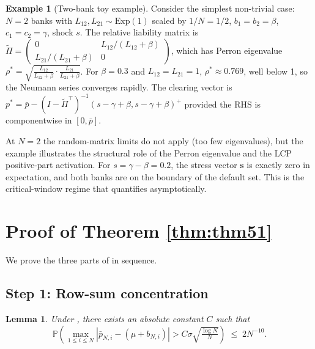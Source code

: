 \documentclass[11pt,a4paper]{article}
\newtheorem{lemma}[theorem]{Lemma}
\theoremstyle{definition}
\newtheorem{example}[theorem]{Example}
\newcommand{\rhoStar}{\rho^\ast}
\begin{document}
\begin{example}[Two-bank toy example]
Consider the simplest non-trivial case: $N = 2$ banks with
$L_{12},L_{21}\sim\mathrm{Exp}(1)$ scaled by $1/N = 1/2$,
$b_1 = b_2 = \beta$, $c_1 = c_2 = \gamma$, shock $s$. The relative liability
matrix is
$\widetilde\Pi = \begin{pmatrix}0 & L_{12}/(L_{12}+\beta)\\ L_{21}/(L_{21}+\beta) & 0\end{pmatrix}$,
which has Perron eigenvalue
$\rhoStar = \sqrt{\frac{L_{12}}{L_{12}+\beta}\cdot\frac{L_{21}}{L_{21}+\beta}}$.
For $\beta = 0.3$ and $L_{12} = L_{21} = 1$, $\rhoStar\approx 0.769$, well
below 1, so the Neumann series converges rapidly. The clearing vector is
$p^\ast = \bar p - (I - \widetilde\Pi^\top)^{-1}(s - \gamma + \beta,s - \gamma+\beta)^+$
provided the RHS is componentwise in $[0,\bar p]$.

At $N = 2$ the random-matrix limits do not apply (too few eigenvalues), but
the example illustrates the structural role of the Perron eigenvalue and the
LCP positive-part activation. For $s = \gamma - \beta = 0.2$, the stress
vector $\mathbf s$ is exactly zero in expectation, and both banks are on
the boundary of the default set. This is the critical-window regime that
 quantifies asymptotically.
\end{example}

\section{Proof of Theorem \ref{thm:thm51}}
\label{sec:proof-51}

We prove the three parts of  in sequence.

\subsection{Step 1: Row-sum concentration}

\begin{lemma}
\label{lem:rowsum}
Under , there exists an absolute constant
$C$ such that
\[
\mathbb P\!\left(\max_{1\leq i\leq N}|\bar p_{N,i} - (\mu + b_{N,i})|>C\sigma\sqrt{\tfrac{\log N}{N}}\right)\;\leq\;2N^{-10}.
\]
\end{lemma}
\end{document}
